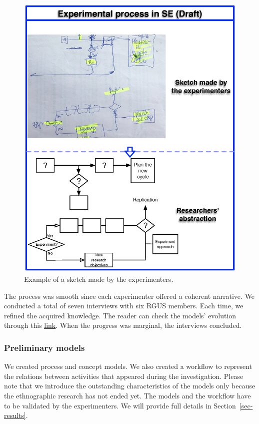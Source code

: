 \begin{figure}[htbp!]
	\centering
	\includegraphics[width=\columnwidth]{images/Process-Approximation-Draft}
	\caption{Example of a sketch made by the experimenters. }
	\label{fig-proceso-exp-boseto}
\end{figure}


The process was smooth since each experimenter offered a coherent narrative. We conducted a total of seven interviews with six RGUS members. Each time, we refined the acquired knowledge. The reader can check the models' evolution through this \href{https://zenodo.org/record/7102213#.YytmMezMLUI}{\ul{link}}. When the progress was marginal, the interviews concluded.

\subsubsection{Preliminary models}\label{sec:preliminary-models}
We created process and concept models. We also created a workflow to represent the relations between activities that appeared during the investigation. Please note that we introduce the outstanding characteristics of the models only because the ethnographic research has not ended yet. The models and the workflow have to be validated by the experimenters. We will provide full details in Section~\ref{sec-results}.

